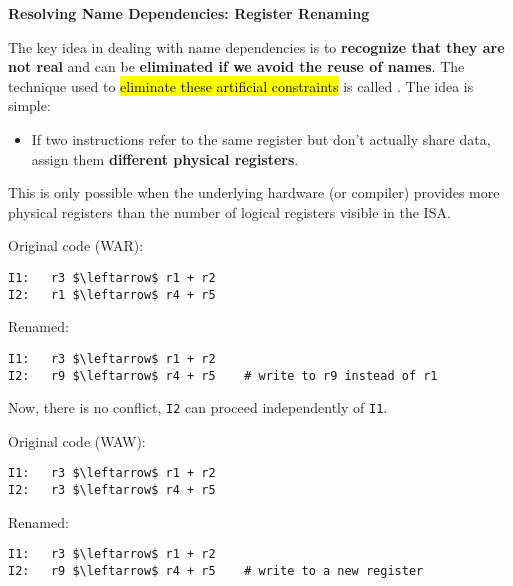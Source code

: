 \highspace
\begin{flushleft}
    \textcolor{Green3}{ \textbf{Resolving Name Dependencies: Register Renaming}}
\end{flushleft}
The key idea in dealing with name dependencies is to \textbf{recognize that they are not real} and can be \textbf{eliminated if we avoid the reuse of names}. The technique used to \hl{eliminate these artificial constraints} is called . The idea is simple:
\begin{itemize}
    \item If two instructions refer to the same register but don't actually share data, assign them \textbf{different physical registers}.
\end{itemize}
This is only possible when the underlying hardware (or compiler) provides more physical registers than the number of logical registers visible in the ISA.

\highspace
\begin{examplebox}
    Original code (WAR):
    \begin{lstlisting}[language=riscv, mathescape=true]
I1:   r3 $\leftarrow$ r1 + r2
I2:   r1 $\leftarrow$ r4 + r5\end{lstlisting}
    Renamed:
    \begin{lstlisting}[language=riscv, mathescape=true]
I1:   r3 $\leftarrow$ r1 + r2
I2:   r9 $\leftarrow$ r4 + r5    # write to r9 instead of r1\end{lstlisting}
    Now, there is no conflict, \texttt{I2} can proceed independently of \texttt{I1}.

    Original code (WAW):
    \begin{lstlisting}[language=riscv, mathescape=true]
I1:   r3 $\leftarrow$ r1 + r2
I2:   r3 $\leftarrow$ r4 + r5\end{lstlisting}
    Renamed:
    \begin{lstlisting}[language=riscv, mathescape=true]
I1:   r3 $\leftarrow$ r1 + r2
I2:   r9 $\leftarrow$ r4 + r5    # write to a new register\end{lstlisting}
\end{examplebox}

\newpage

